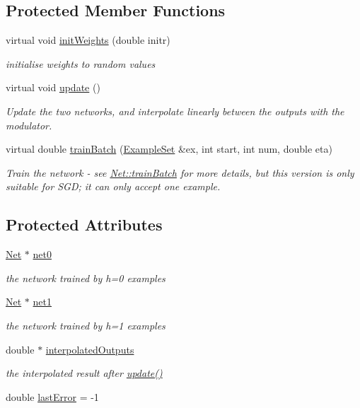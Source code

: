 \subsection*{Protected Member Functions}
\begin{DoxyCompactItemize}
\item 
virtual void \hyperlink{classOutputBlendingNet_abb65aa0c88e2e29a17b4f91e1c6d7b03}{init\+Weights} (double initr)
\begin{DoxyCompactList}\small\item\em initialise weights to random values \end{DoxyCompactList}\item 
virtual void \hyperlink{classOutputBlendingNet_a879f1eedcfad5238d9bdbc78ef5f8250}{update} ()
\begin{DoxyCompactList}\small\item\em Update the two networks, and interpolate linearly between the outputs with the modulator. \end{DoxyCompactList}\item 
virtual double \hyperlink{classOutputBlendingNet_a4c65f752aeedb75c230773965d35df3b}{train\+Batch} (\hyperlink{classExampleSet}{Example\+Set} \&ex, int start, int num, double eta)
\begin{DoxyCompactList}\small\item\em Train the network -\/ see \hyperlink{classNet_a6ac1fa9f916aa77906581af9140b8175}{Net\+::train\+Batch} for more details, but this version is only suitable for S\+GD; it can only accept one example. \end{DoxyCompactList}\end{DoxyCompactItemize}
\subsection*{Protected Attributes}
\begin{DoxyCompactItemize}
\item 
\hyperlink{classNet}{Net} $\ast$ \hyperlink{classOutputBlendingNet_aa65fd4a6057be9228b1522305ab26b4f}{net0}
\begin{DoxyCompactList}\small\item\em the network trained by h=0 examples \end{DoxyCompactList}\item 
\hyperlink{classNet}{Net} $\ast$ \hyperlink{classOutputBlendingNet_ac4c73caa5df06dbdb0046f0001b165b6}{net1}
\begin{DoxyCompactList}\small\item\em the network trained by h=1 examples \end{DoxyCompactList}\item 
double $\ast$ \hyperlink{classOutputBlendingNet_a7630d572e167ebc864377fe9fc9e8b5d}{interpolated\+Outputs}
\begin{DoxyCompactList}\small\item\em the interpolated result after \hyperlink{classOutputBlendingNet_a879f1eedcfad5238d9bdbc78ef5f8250}{update()} \end{DoxyCompactList}\item 
double \hyperlink{classOutputBlendingNet_a8a477ba9ec71fd7780a3efd96539224e}{last\+Error} = -\/1
\end{DoxyCompactItemize}
